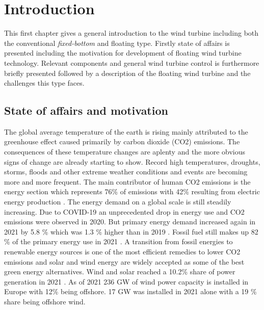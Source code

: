 \section{Introduction} \label{sec:intro}
This first chapter gives a general introduction to the wind turbine including both the conventional \textit{fixed-bottom} and floating type. Firstly state of affairs is presented including the motivation for development of floating wind turbine technology. Relevant components and general wind turbine control is furthermore briefly presented followed by a description of the floating wind turbine and the challenges this type faces.


\subsection{State of affairs and motivation} \label{sec:intro_stateofaffairs}
The global average temperature of the earth is rising mainly attributed to the greenhouse effect caused primarily by carbon dioxide (CO2) emissions. The consequences of these temperature changes are aplenty and the more obvious signs of change are already starting to show. Record high temperatures, droughts, storms, floods and other extreme weather conditions and events are becoming more and more frequent. The main contributor of human CO2 emissions is the energy section which represents 76\% of emissions with 42\% resulting from electric energy production \cite{wri2018}. The energy demand on a global scale is still steadily increasing. Due to COVID-19 an unprecedented drop in energy use and CO2 emissions were observed in 2020. But primary energy demand increased again in 2021 by 5.8 \% which was 1.3 \% higher than in 2019 \cite{bp2022}. Fossil fuel still makes up 82 \% of the primary energy use in 2021 \cite{bp2022}. A transition from fossil energies to renewable energy sources is one of the most efficient remedies to lower CO2 emissions and solar and wind energy are widely accepted as some of the best green energy alternatives. Wind and solar reached a 10.2\% share of power generation in 2021 \cite{bp2022}. As of 2021 236 GW of wind power capacity is installed in Europe with 12\% being offshore. 17 GW was installed in 2021 alone with a 19 \% share being offshore wind\cite{Sesto1992}.

